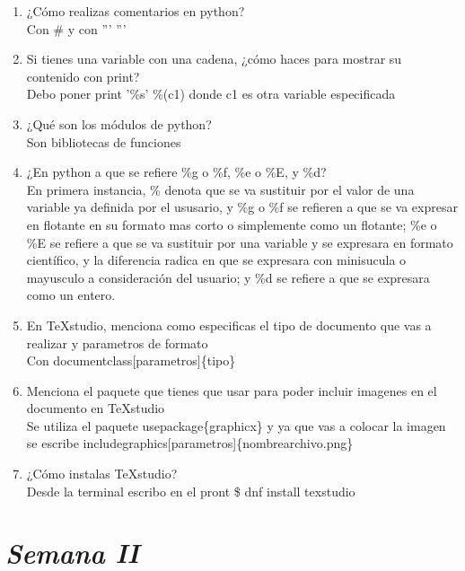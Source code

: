 \documentclass{book}
\begin{document}
\begin{enumerate}
	\item ¿Cómo realizas comentarios en python?\\
	Con \# y con '''  '''
	\item Si tienes una variable con una cadena, ¿cómo haces para mostrar su contenido con print?\\
	Debo poner print '\%s' \%(c1) donde c1 es otra variable especificada
	\item ¿Qué son los módulos de python?\\
	Son bibliotecas de funciones
	\item ¿En python a que se refiere \%g o  \%f, \%e o \%E, y \%d?\\
	En primera instancia, \% denota que se va sustituir por el valor de una variable ya definida por el ususario, y \%g o  \%f se refieren a que se va expresar en flotante en su formato mas corto o simplemente como un flotante; \%e o \%E se refiere a que se va sustituir por una variable y se expresara en formato científico, y la diferencia radica en que se expresara con minisucula o mayusculo a consideración del usuario; y \%d se refiere a que se expresara como un entero.
	\item En TeXstudio, menciona como especificas el tipo de documento que vas a realizar y parametros de formato\\
	Con documentclass[parametros]\{tipo\}
	\item Menciona el paquete que tienes que usar para poder incluir imagenes en el documento en TeXstudio\\
	Se utiliza el paquete usepackage\{graphicx\} y ya que vas a colocar la imagen se escribe includegraphics[parametros]\{nombrearchivo.png\}
	\item ¿Cómo instalas TeXstudio?\\
	Desde la terminal escribo en el pront \$ dnf install texstudio
	
	
	
	
\end{enumerate}%



\section{\textit{Semana II}}%
\end{document}
